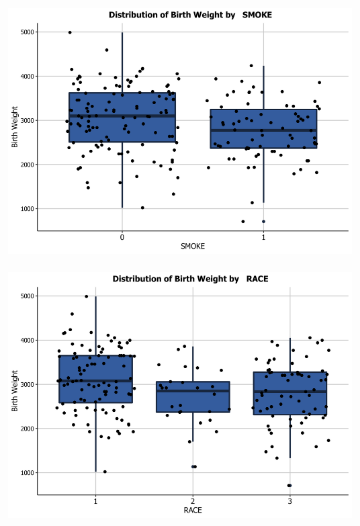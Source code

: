 \vspace{0.5cm}
\begin{figure}[!htb]
        \centering
        \begin{subfigure}[b]{0.4\textwidth}
            \centering
            \includegraphics[width=\textwidth]{Images/SMOKE.png}
            \label{fig:BWTvsSMOKE}
        \end{subfigure}
        \quad
        \begin{subfigure}[b]{0.4\textwidth}  
            \centering 
            \includegraphics[width=\textwidth]{Images/RACE.png}
            \label{fig:BWTvsRACE}
        \end{subfigure}
        
        \hfill
        

\end{figure}
